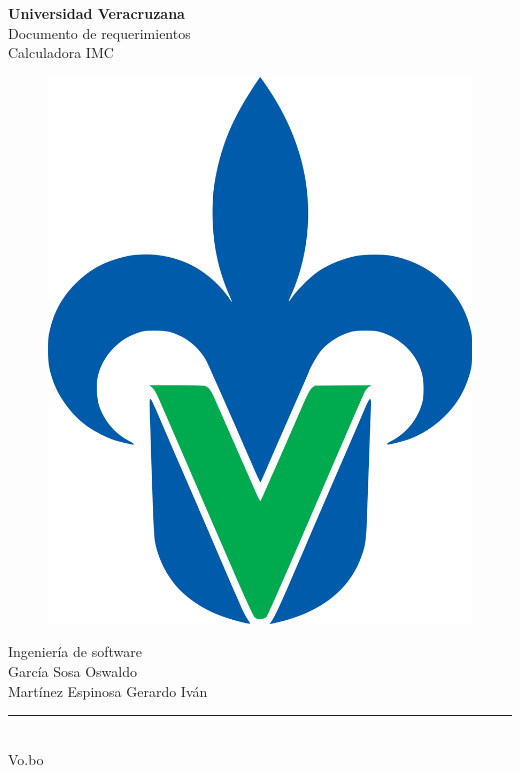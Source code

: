 \begin{titlepage}
	\begin{center}
	{\huge \textbf{Universidad Veracruzana}}\\
	\vspace{2cm}  
	{\Large {Documento de requerimientos}}\\
	\vspace{5mm}	
	{\Large {Calculadora IMC}}\\
	\begin{figure}[h]
		\centering
		\includegraphics[scale=0.10]{uvlogo}
	\end{figure}
	{\Large {Ingeniería de software}}\\
    \vspace{2cm}
	{\Large {García Sosa Oswaldo }}\\
	\vspace{5mm}	
	{\Large {Martínez Espinosa Gerardo Iván}}\\
	\vspace{15mm}	
    \rule{8cm}{0.5mm} \\ \Large Vo.bo\\ 
	\end{center}
\end{titlepage}